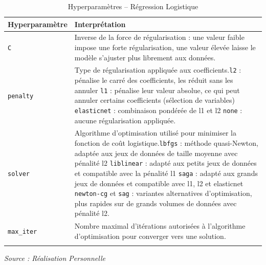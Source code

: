 \documentclass[a4paper,12pt, oneside]{article}
\begin{document}
\begin{longtable}{|m{5cm}|m{12cm}|}
\hline
\textbf{Hyperparamètre} & \textbf{Interprétation} \\
\hline
\texttt{C} & Inverse de la force de régularisation : une valeur faible impose une forte régularisation, une valeur élevée laisse le modèle s'ajuster plus librement aux données. \\
\hline
\texttt{penalty} & Type de régularisation appliquée aux coefficients.\newline\texttt{l2} : pénalise le carré des coefficients, les réduit sans les annuler \newline\texttt{l1} : pénalise leur valeur absolue, ce qui peut annuler certains coefficients (sélection de variables) \newline \texttt{elasticnet} : combinaison pondérée de l1 et l2 \newline \texttt{none} : aucune régularisation appliquée. \\
\hline
\texttt{solver} & Algorithme d'optimisation utilisé pour minimiser la fonction de coût logistique.\newline \texttt{lbfgs} : méthode quasi-Newton, adaptée aux jeux de données de taille moyenne avec pénalité l2 \newline \texttt{liblinear} : adapté aux petits jeux de données et compatible avec la pénalité l1 \newline \texttt{saga} : adapté aux grands jeux de données et compatible avec l1, l2 et elasticnet \newline \texttt{newton-cg} et \texttt{sag} : variantes alternatives d'optimisation, plus rapides sur de grands volumes de données avec pénalité l2. \\
\hline
\texttt{max\_iter} & Nombre maximal d'itérations autorisées à l'algorithme d'optimisation pour converger vers une solution. \\
\hline
\caption{Hyperparamètres -- Régression Logistique}
\end{longtable}
\begin{center}
\vspace{-0.85cm}
\textit{Source : Réalisation Personnelle}
\end{center}
\end{document}
